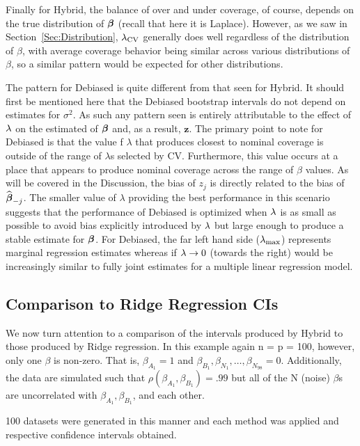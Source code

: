 Finally for Hybrid, the balance of over and under coverage, of course, depends on the true distribution of $\boldsymbol{\beta}$ (recall that here it is Laplace). However, as we saw in Section~\ref{Sec:Distribution}, $\lambda_{\textrm{CV}}$ generally does well regardless of the distribution of $\beta$, with average coverage behavior being similar across various distributions of $\beta$, so a similar pattern would be expected for other distributions.

The pattern for Debiased is quite different from that seen for Hybrid. It should first be mentioned here that the Debiased bootstrap intervals do not depend on estimates for $\sigma^2$. As such any pattern seen is entirely attributable to the effect of $\lambda$ on the estimated of $\boldsymbol{\beta}$ and, as a result, $\boldsymbol{z}$. The primary point to note for Debiased is that the value f $\lambda$ that produces closest to nominal coverage is outside of the range of $\lambda$s selected by CV. Furthermore, this value occurs at a place that appears to produce nominal coverage across the range of $\beta$ values. As will be covered in the Discussion, the bias of $z_j$ is directly related to the bias of $\widehat{\boldsymbol{\beta}}_{-j}$. The smaller value of $\lambda$ providing the best performance in this scenario suggests that the performance of Debiased is optimized when $\lambda$ is as small as possible to avoid bias explicitly introduced by $\lambda$ but large enough to produce a stable estimate for $\boldsymbol{\beta}$. For Debiased, the far left hand side ($\lambda_{\max}$) represents marginal regression estimates whereas if $\lambda \rightarrow 0$ (towards the right) would be increasingly similar to fully joint estimates for a multiple linear regression model.

\subsection{Comparison to Ridge Regression CIs}\label{Sec:Ridge}

We now turn attention to a comparison of the intervals produced by Hybrid to those produced by Ridge regression. In this example again n = p = 100, however, only one $\beta$ is non-zero. That is, $\beta_{A_1} = 1$ and $\beta_{B_1}, \beta_{N_1}, \ldots, \beta_{N_{98}} = 0$. Additionally, the data are simulated such that $\rho(\beta_{A_1}, \beta_{B_1}) = .99$ but all of the N (noise) $\beta$s are uncorrelated with $\beta_{A_1}, \beta_{B_1}$, and each other.

100 datasets were generated in this manner and each method was applied and respective confidence intervals obtained.

